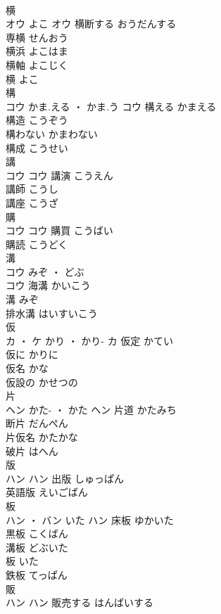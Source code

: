 \documentclass[8pt]{extreport}
\begin{document}
\begin{CJK}{UTF8}{min}
\\	横	
\\	オウ	よこ	オウ	横断する	おうだんする	
\\	専横	せんおう	
\\	横浜	よこはま	
\\	横軸	よこじく	
\\	横	よこ	
\\	構	
\\	コウ	かま.える ・ かま.う	コウ	構える	かまえる	
\\	構造	こうぞう	
\\	構わない	かまわない	
\\	構成	こうせい	
\\	講	
\\	コウ		コウ	講演	こうえん	
\\	講師	こうし	
\\	講座	こうざ	
\\	購	
\\	コウ		コウ	購買	こうばい	
\\	購読	こうどく	
\\	溝	
\\	コウ	みぞ ・ どぶ
\\	コウ	海溝	かいこう	
\\	溝	みぞ	
\\	排水溝	はいすいこう	
\\	仮	
\\	カ ・ ケ	かり ・ かり-	カ	仮定	かてい	
\\	仮に	かりに	
\\	仮名	かな	
\\	仮設の	かせつの	
\\	片	
\\	ヘン	かた- ・ かた	ヘン	片道	かたみち	
\\	断片	だんぺん	
\\	片仮名	かたかな	
\\	破片	はへん	
\\	版	
\\	ハン		ハン	出版	しゅっぱん	
\\	英語版	えいごばん	
\\	板	
\\	ハン ・ バン	いた	ハン	床板	ゆかいた	
\\	黒板	こくばん	
\\	溝板	どぶいた	
\\	板	いた	
\\	鉄板	てっぱん	
\\	販	
\\	ハン		ハン	販売する	はんばいする	

\end{CJK}
\end{document}
